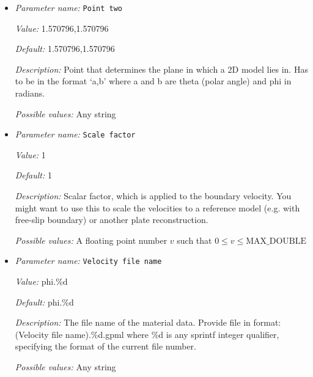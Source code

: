 \begin{itemize}
{\it Value:} 1.570796,0.0


{\it Default:} 1.570796,0.0


{\it Description:} Point that determines the plane in which a 2D model lies in. Has to be in the format `a,b' where a and b are theta (polar angle)  and phi in radians.


{\it Possible values:} Any string
\item {\it Parameter name:} {\tt Point two}
\label{parameters:Boundary velocity model/GPlates model/Point two}


{\it Value:} 1.570796,1.570796


{\it Default:} 1.570796,1.570796


{\it Description:} Point that determines the plane in which a 2D model lies in. Has to be in the format `a,b' where a and b are theta (polar angle)  and phi in radians.


{\it Possible values:} Any string
\item {\it Parameter name:} {\tt Scale factor}
\label{parameters:Boundary velocity model/GPlates model/Scale factor}


{\it Value:} 1


{\it Default:} 1


{\it Description:} Scalar factor, which is applied to the boundary velocity. You might want to use this to scale the velocities to a reference model (e.g. with free-slip boundary) or another plate reconstruction.


{\it Possible values:} A floating point number $v$ such that $0 \leq v \leq \text{MAX\_DOUBLE}$
\item {\it Parameter name:} {\tt Velocity file name}
\label{parameters:Boundary velocity model/GPlates model/Velocity file name}


{\it Value:} phi.\%d


{\it Default:} phi.\%d


{\it Description:} The file name of the material data. Provide file in format: (Velocity file name).\%d.gpml where \%d is any sprintf integer qualifier, specifying the format of the current file number.


{\it Possible values:} Any string
\end{itemize}

